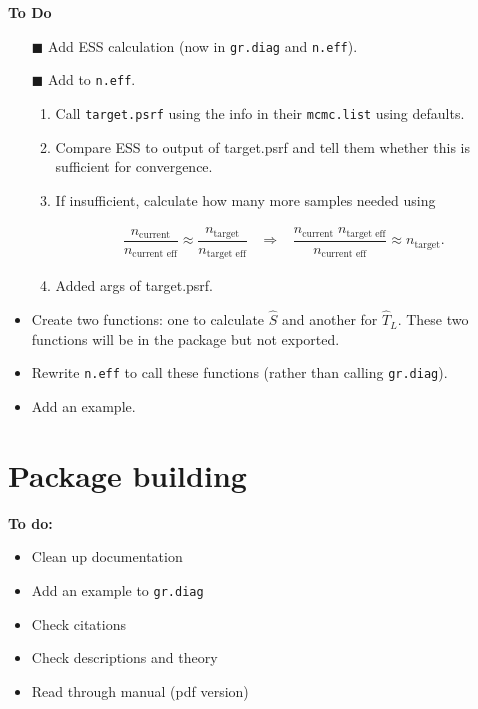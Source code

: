 \documentclass[12pt]{article}
\theoremstyle{remark}
\begin{document}
\textbf{To Do} %


\begin{itemize}
 \renewcommand{\labelitemi}{$\square$}
\item[$\blacksquare$]  Add ESS calculation (now in \texttt{gr.diag} and \texttt{n.eff}).
\item[$\blacksquare$]  Add to \texttt{n.eff}. 
\begin{enumerate}
\item Call \texttt{target.psrf} using the info in their \texttt{mcmc.list} using  defaults.
\item Compare ESS to output of target.psrf and tell them whether this is sufficient for convergence.
\item If insufficient, calculate how many more samples needed using


\begin{align*}
\dfrac{n_\text{current}}{n_{ \text{current eff}}} \approx \dfrac{n_{\text{target}}}{n_{ \text{target eff}}}
\;\;\;  \Longrightarrow \;\;\;
 \dfrac{n_{\text{current}} \; n_{ \text{target eff}}}{n_{ \text{current eff}}}  \approx n_{\text{target}}.
\end{align*}
\item Added args of target.psrf.
\end{enumerate}
\item Create two functions: one to calculate $\hat{S}$ and another for $\hat{T}_L$. These two functions will be in the package but not exported. 
\item Rewrite \texttt{n.eff} to call these functions (rather than calling \texttt{gr.diag}).

\item Add an example.

\end{itemize}






\section{\textbf{Package building}}
\textbf{To do:}
\begin{itemize}
 \renewcommand{\labelitemi}{$\square$}
\item Clean up documentation
\item Add an example to \texttt{gr.diag} 
\item Check citations
\item Check descriptions and theory
\item Read through manual (pdf version)
\end{itemize}
\end{document}
